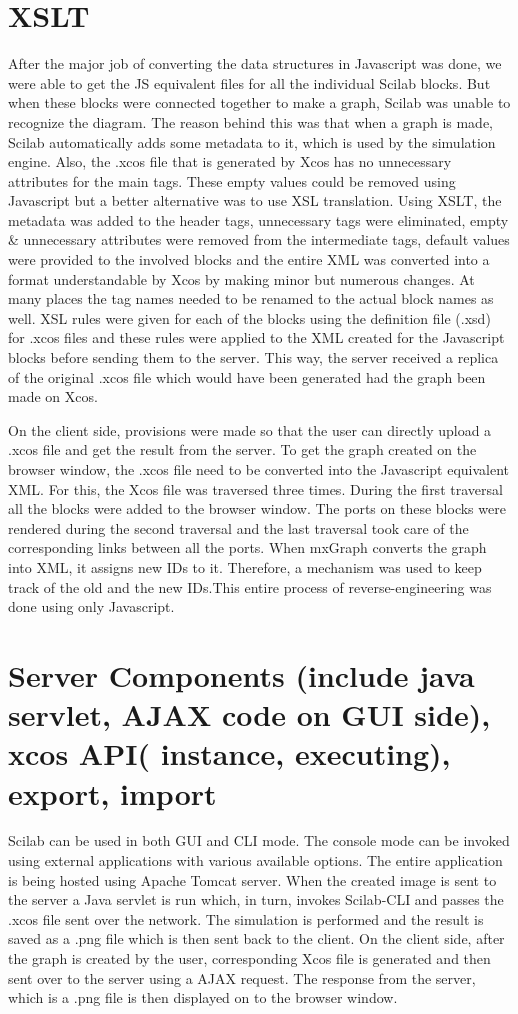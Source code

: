 \documentclass[conference]{IEEEtran}
\begin{document}
\section{XSLT}
After the major job of converting the data structures in Javascript was done, we were able to get the JS equivalent files for all the individual Scilab blocks. But when these blocks were connected together to make a graph, Scilab was unable to recognize the diagram. The reason behind this was that when a graph is made, Scilab automatically adds some metadata to it, which is used by the simulation engine. Also, the .xcos file that is generated by Xcos has no unnecessary attributes for the main tags. These empty values could be removed using Javascript but a better alternative was to use XSL translation. Using XSLT, the metadata was added to the header tags, unnecessary tags were eliminated, empty & unnecessary attributes were removed from the intermediate tags, default values were provided to the involved blocks and the entire XML was converted into a format understandable by Xcos by making minor but numerous changes. At many places the tag names needed to be renamed to the actual block names as well. XSL rules were given for each of the blocks using the definition file (.xsd) for .xcos files and these rules were applied to the XML created for the Javascript blocks before sending them to the server. This way, the server received a replica of the original .xcos file which would have been generated had the graph been made on Xcos. 

On the client side, provisions were made so that the user can directly upload a .xcos file and get the
result from the server. To get the graph created on the browser window, the .xcos file need to be converted into the Javascript equivalent XML. For this, the Xcos file was traversed three times. During the first traversal all the blocks were added to the browser window. The ports on these blocks were rendered during the second traversal and the last traversal took care of the corresponding links between all the ports. When mxGraph converts the graph into XML, it assigns new IDs to it. Therefore, a mechanism was used to keep track of the old and the new IDs.This entire process of reverse-engineering was done using only Javascript. 


\section{Server Components (include java servlet, AJAX code on GUI side), xcos API( instance, executing), export, import}
Scilab can be used in both GUI and CLI mode. The console mode can be invoked using external applications with various available options. The entire application is being hosted using Apache Tomcat server. When the created image is sent to the server a Java servlet is run which, in turn, invokes Scilab-CLI and passes the .xcos file sent over the network. The simulation is performed and the result is saved as a .png file which is then sent back to the client.
    On the client side, after the graph is created by the user, corresponding Xcos file is generated and 
then sent over to the server using a AJAX request. The response from the server, which is a .png file is then displayed on to the browser window. 
    
\end{document}
